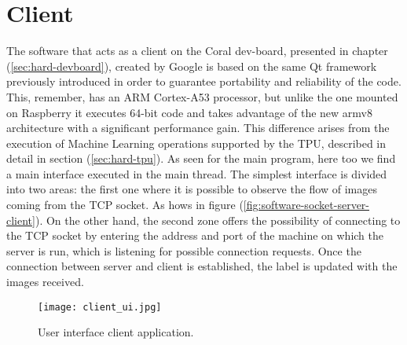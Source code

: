 %
\section{Client}
\label{sec:software-coral-intro}
The software that acts as a client on the Coral dev-board, presented in chapter
(\ref{sec:hard-devboard}), created by Google is based on the same Qt framework previously
introduced in order to guarantee portability and reliability of the code. This,
remember, has an ARM Cortex-A53 processor, but unlike the one mounted on
Raspberry it executes 64-bit code and takes advantage of the new armv8
architecture with a significant performance gain. This difference arises from
the execution of Machine Learning operations supported by the TPU, described in
detail in section (\ref{sec:hard-tpu}).
%
As seen for the main program, here too we find a main interface executed in the
main thread. The simplest interface is divided into two areas: the first one
where it is possible to observe the flow of images coming from the TCP socket. As hows in figure (\ref{fig:software-socket-server-client}).\hfill \break
On the other hand, the second zone offers the possibility of
connecting to the TCP socket by entering the address and port of the machine on
which the server is run, which is listening for possible connection requests.
Once the connection between server and client is established, the label is
updated with the images received.
%
%
\begin{figure}[htb]
	\centering
	\texttt{[image: client\_ui.jpg]}
	\caption{User interface client application.}
	\label{fig:software-client-ui}
\end{figure}
%
